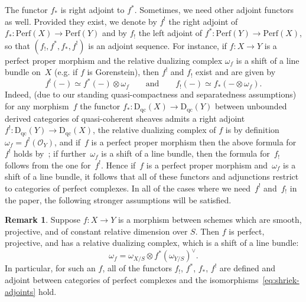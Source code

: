 \documentclass[11pt, reqno]{amsart}
\numberwithin{equation}{section}
\theoremstyle{plain}
\theoremstyle{definition}
\newtheorem{remark}[theorem]{Remark}
\newcommand{\Perf}{\mathrm{Perf}}
\newcommand{\svee}{\scriptscriptstyle\vee}
\newcommand{\QCoh}{\mathrm{D_{qc}}}
\newcommand{\cO}{\mathcal{O}}
\begin{document}
The functor $f_*$ is right adjoint to $f^*$. 
Sometimes, we need other adjoint functors as well.
Provided they exist, we denote by $f^!$ the right adjoint of $f_* \colon \Perf(X) \to \Perf(Y)$ and by 
$f_!$ the left adjoint of $f^* \colon \Perf(Y) \to \Perf(X)$, so that $(f_!,f^*,f_*,f^!)$ is an adjoint sequence.
For instance, if $f \colon X \to Y$ is a perfect proper morphism and 
the relative dualizing complex $\omega_f$ is a shift of a line bundle on~$X$ (e.g. if $f$ is Gorenstein), 
then $f^!$ and $f_!$ exist and are given by 
\begin{equation}
\label{eq:shriek-adjoints}
f^!(-) \simeq f^*(-) \otimes \omega_f 
\qquad \text{and} \qquad 
f_!(-) \simeq f_*(- \otimes \omega_f). 
\end{equation}
Indeed, (due to our standing quasi-compactness and separatedness assumptions) for any morphism~$f$ 
the functor  $f_* \colon \QCoh(X) \to \QCoh(Y)$ between unbounded derived categories of quasi-coherent sheaves 
admits a right adjoint $f^! \colon \QCoh(Y) \to \QCoh(X)$, 
the relative dualizing complex of $f$ is by definition $\omega_f = f^!(\cO_Y)$, 
and if~$f$ is a perfect proper morphism then the above formula for~$f^!$ holds by~\cite[Proposition 2.1]{lipman}; 
if further~$\omega_f$ is a shift of a line bundle, then the formula for~$f_!$ follows from the one for~$f^!$. 
Hence if~$f$ is a perfect proper morphism and~$\omega_f$ is a shift of a line bundle, 
it follows that all of these functors and adjunctions restrict to categories of perfect complexes. 
In all of the cases where we need~$f^!$ and~$f_!$ in the paper, the following stronger assumptions will be satisfied.

\begin{remark}
\label{remark:good-morphism}
Suppose $f \colon X \to Y$ is a morphism between schemes which 
are smooth, projective, and of constant relative dimension over $S$. 
Then $f$ is perfect, projective, and has a relative dualizing complex, which is a shift of a line bundle: 
\begin{equation}
\label{eq:intro-omega-f}
\omega_{f} = \omega_{X/S} \otimes f^*(\omega_{Y/S})^{\svee} . 
\end{equation}
In particular, for such an $f$, all of the functors $f_!$, $f^*$, $f_*$, $f^!$ are defined 
and adjoint between categories of perfect complexes 
and the isomorphisms~\eqref{eq:shriek-adjoints} hold.
\end{remark} 
\end{document}
